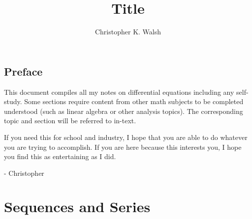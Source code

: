 \documentclass[12pt,openany]{book}
\title{Title}
\author{Christopher K. Walsh}
\theoremstyle{mydefinitionstyle}
\theoremstyle{myexamplestyle}
\theoremstyle{remark}
\begin{document}
\maketitle
\tableofcontents

\newpage
\section*{Preface}
This document compiles all my notes on differential equations including any self-study.
Some sections require content from other math subjects to be completed understood (such as linear algebra or other analysis topics).
The corresponding topic and section will be referred to in-text.

If you need this for school and industry, I hope that you are able to do whatever you are trying to accomplish.
If you are here because this interests you, I hope you find this as entertaining as I did.

- Christopher

\chapter{Sequences and Series}

\end{document}
